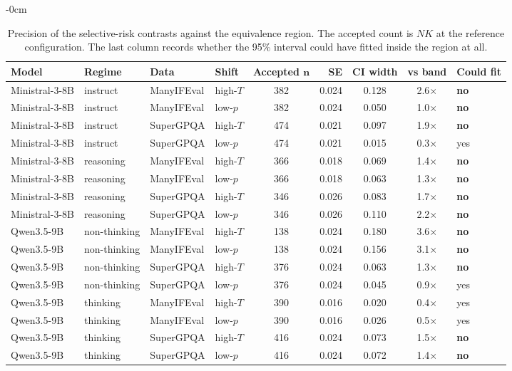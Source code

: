 \begin{table}[H]
\begin{adjustwidth}{-\extralength}{0cm}
\small
\caption{Precision of the selective-risk contrasts against the equivalence region. The accepted count is $NK$ at the reference configuration. The last column records whether the 95\% interval could have fitted inside the region at all.\label{tab:precision}}
\begin{tabular}{llllcrccl}
\toprule
\textbf{Model} & \textbf{Regime} & \textbf{Data} & \textbf{Shift} & \textbf{Accepted} $\boldsymbol{n}$ & \textbf{SE} & \textbf{CI width} & \textbf{vs band} & \textbf{Could fit} \\
\midrule
Ministral-3-8B & instruct & ManyIFEval & high-$T$ & 382 & 0.024 & 0.128 & 2.6$\times$ & \textbf{no} \tabularnewline
Ministral-3-8B & instruct & ManyIFEval & low-$p$ & 382 & 0.024 & 0.050 & 1.0$\times$ & \textbf{no} \tabularnewline
Ministral-3-8B & instruct & SuperGPQA & high-$T$ & 474 & 0.021 & 0.097 & 1.9$\times$ & \textbf{no} \tabularnewline
Ministral-3-8B & instruct & SuperGPQA & low-$p$ & 474 & 0.021 & 0.015 & 0.3$\times$ & yes \tabularnewline
Ministral-3-8B & reasoning & ManyIFEval & high-$T$ & 366 & 0.018 & 0.069 & 1.4$\times$ & \textbf{no} \tabularnewline
Ministral-3-8B & reasoning & ManyIFEval & low-$p$ & 366 & 0.018 & 0.063 & 1.3$\times$ & \textbf{no} \tabularnewline
Ministral-3-8B & reasoning & SuperGPQA & high-$T$ & 346 & 0.026 & 0.083 & 1.7$\times$ & \textbf{no} \tabularnewline
Ministral-3-8B & reasoning & SuperGPQA & low-$p$ & 346 & 0.026 & 0.110 & 2.2$\times$ & \textbf{no} \tabularnewline
Qwen3.5-9B & non-thinking & ManyIFEval & high-$T$ & 138 & 0.024 & 0.180 & 3.6$\times$ & \textbf{no} \tabularnewline
Qwen3.5-9B & non-thinking & ManyIFEval & low-$p$ & 138 & 0.024 & 0.156 & 3.1$\times$ & \textbf{no} \tabularnewline
Qwen3.5-9B & non-thinking & SuperGPQA & high-$T$ & 376 & 0.024 & 0.063 & 1.3$\times$ & \textbf{no} \tabularnewline
Qwen3.5-9B & non-thinking & SuperGPQA & low-$p$ & 376 & 0.024 & 0.045 & 0.9$\times$ & yes \tabularnewline
Qwen3.5-9B & thinking & ManyIFEval & high-$T$ & 390 & 0.016 & 0.020 & 0.4$\times$ & yes \tabularnewline
Qwen3.5-9B & thinking & ManyIFEval & low-$p$ & 390 & 0.016 & 0.026 & 0.5$\times$ & yes \tabularnewline
Qwen3.5-9B & thinking & SuperGPQA & high-$T$ & 416 & 0.024 & 0.073 & 1.5$\times$ & \textbf{no} \tabularnewline
Qwen3.5-9B & thinking & SuperGPQA & low-$p$ & 416 & 0.024 & 0.072 & 1.4$\times$ & \textbf{no} \tabularnewline
\bottomrule
\end{tabular}
\end{adjustwidth}
\end{table}
